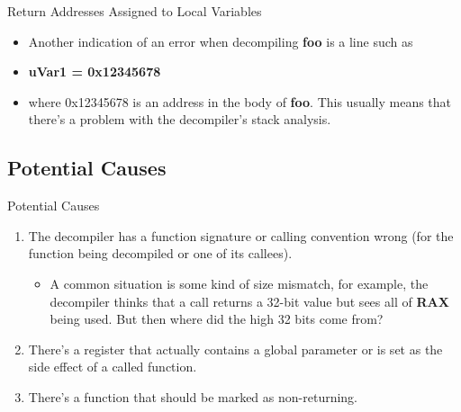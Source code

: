 \documentclass{beamer}
\begin{document}
\begin{frame}
\begin{block}{Return Addresses Assigned to Local Variables}
\begin{itemize}
\item Another indication of an error when decompiling \textbf{foo} is a line such as
\item[] \textbf{uVar1 = 0x12345678} 
\item[] where 0x12345678 is an address in the body of \textbf{foo}.  This usually means that there's a problem with the decompiler's stack analysis.
\end{itemize}
\end{block}
\end{frame}

\subsection{Potential Causes}
\begin{frame}
\begin{block}{Potential Causes}
\begin{enumerate}
\item The decompiler has a function signature or calling convention wrong (for the function being decompiled or one of its callees). 
\begin{itemize}
\item A common situation is some kind of size mismatch, for example, the decompiler thinks that a call returns a 32-bit value but sees all of 
\textbf{RAX} being used. But then where did the high 32 bits come from?
\end{itemize}
\item There's a register that actually contains a global parameter or is set as the side effect of a called function.
\item There's a function that should be marked as non-returning.
\end{enumerate}
\end{block}
\end{frame}
\end{document}
